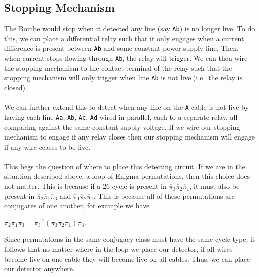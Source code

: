 \subsection{Stopping Mechanism}
The Bombe would stop when it detected
any line (say \texttt{Ab}) is no longer live. To do this, we can
place a differential
relay such that it only engages when a current difference is present
between \texttt{Ab} and some constant power supply line. Then, when
current stops
flowing through \texttt{Ab}, the relay will trigger. We can then wire the
stopping mechanism to the contact terminal of the relay such that the
stopping mechanism will only trigger when line \texttt{Ab} is not live (i.e.\ the relay is closed).
\\\\We can further extend this to detect when any line on the \texttt{A}
cable is not live by having each line \texttt{Aa}, \texttt{Ab},
\texttt{Ac}, \texttt{Ad} wired in
parallel, each to a separate relay, all comparing against the same
constant supply voltage. If we wire our stopping mechanism to engage
if any relay closes
then our stopping mechanism will engage if any wire ceases to be live.
\\\\This begs the question of where to place this detecting circuit.
If we are in the situation described above, a loop of Enigma
permutations, then this choice does not matter. This is because if a
$26$-cycle is present in
$\overline\pi_3\overline\pi_2\overline\pi_1$, it must also
be present in
$\overline\pi_2\overline\pi_1\overline\pi_3$ and
$\overline\pi_1\overline\pi_2\overline\pi_1$. This is
because all of these permutations are conjugates of one another, for
example we have
\begin{center}
  $\overline\pi_2\overline\pi_1\overline\pi_3 =
  \overline\pi_3^{-1}(\overline\pi_3\overline\pi_2\overline\pi_1)\overline\pi_3$.
\end{center}
Since permutations in the same conjugacy class must have the same
cycle type, it follows that no matter where in the loop we place our
detector, if all wires become live on one cable they will become live
on all cables. Thus, we can place our detector anywhere.

